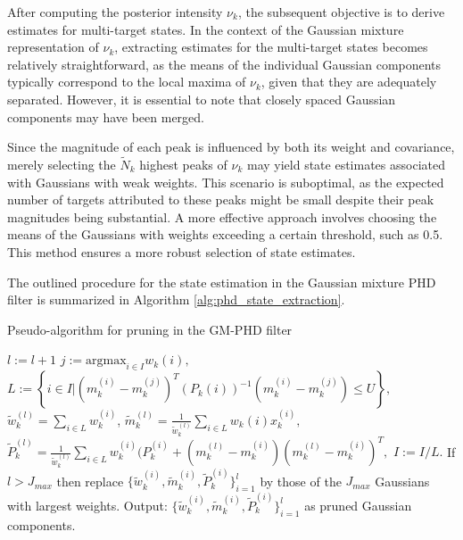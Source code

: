 After computing the posterior intensity $\nu_k$, the subsequent objective is to derive estimates for multi-target states. In the context of the Gaussian mixture representation of $\nu_k$, extracting estimates for the multi-target states becomes relatively straightforward, as the means of the individual Gaussian components typically correspond to the local maxima of $\nu_k$, given that they are adequately separated. However, it is essential to note that closely spaced Gaussian components may have been merged.

Since the magnitude of each peak is influenced by both its weight and covariance, merely selecting the $\tilde{N}_k$
highest peaks of $\nu_k$ may yield state estimates associated with Gaussians with weak weights. This scenario is
suboptimal, as the expected number of targets attributed to these peaks might be small despite their peak magnitudes being substantial. A more effective approach involves choosing the means of the Gaussians with weights exceeding a certain threshold, such as 0.5. This method ensures a more robust selection of state estimates.

The outlined procedure for the state estimation in the Gaussian mixture PHD filter is summarized in Algorithm \ref{alg:phd_state_extraction}.

\begin{algorithm}
    \caption{Pseudo-algorithm for pruning in the GM-PHD filter}
    \begin{algorithmic}[1]
            \State $l:= l+1$
            \State $j:= \text{argmax}_{i \in I} w_k{(i)},$
            \State $L:= \left\{ i \in I | (m_k^{(i)} - m_k^{(j)})^T (P_k{(i)})^{-1} (m_k^{(i)} - m_k^{(j)}) \leq U \right\},$
            \State $\tilde{w}_k^{(l)} = \sum_{i \in L} w_k^{(i)}$,
            \State $\tilde{m}_k^{(l)} = \frac{1}{\tilde{w}_k^{(l)}} \sum_{i \in L} w_k{(i)} x_k^{(i)},$
            \State $\tilde{P}_k^{(l)} = \frac{1}{\tilde{w}_k^{(l)}} \sum_{i \in L} w_k^{(i)} (P_k^{(i)} + (m_k^{(l)} - m _k^{(i)}) (m_k^{(l)} - m _k^{(i)})^T,$
            \State $I:= I/L.$
        \EndWhile
        \EndProcedure
        \State
        \State If $l > J_{max}$ then replace $\{ \tilde{w}_k^{(i)}, \tilde{m}_k^{(i)}, \tilde{P}_k^{(i)} \}_{i=1}^l$
        by those of the $J_{max}$ Gaussians with largest weights.
        \State
        \State Output: $\{ \tilde{w}_k^{(i)}, \tilde{m}_k^{(i)}, \tilde{P}_k^{(i)} \}_{i=1}^l$ as pruned Gaussian components.

    \end{algorithmic}
    \label{alg:phd_merging}
\end{algorithm}

